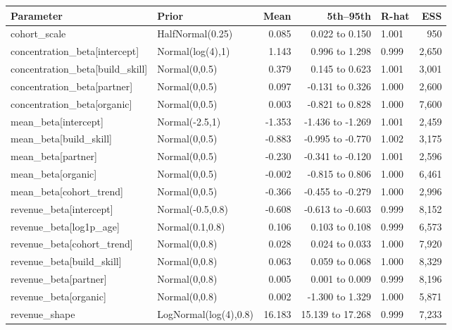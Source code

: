 \documentclass[10pt]{article}
\begin{document}
{\fontsize{7.8}{9.5}\selectfont \par\begin{tabularx}{\linewidth}{@{}p{.22\linewidth}p{.20\linewidth}rrYr@{}}\toprule
\textbf{Parameter} & \textbf{Prior} & \textbf{Mean} & \textbf{5th--95th} & \textbf{R-hat} & \textbf{ESS}\\\midrule
cohort\_scale & HalfNormal(0.25) & 0.085 & 0.022 to 0.150 & 1.001 & 950\\
concentration\_beta[intercept] & Normal(log(4),1) & 1.143 & 0.996 to 1.298 & 0.999 & 2,650\\
concentration\_beta[build\_skill] & Normal(0,0.5) & 0.379 & 0.145 to 0.623 & 1.001 & 3,001\\
concentration\_beta[partner] & Normal(0,0.5) & 0.097 & -0.131 to 0.326 & 1.000 & 2,600\\
concentration\_beta[organic] & Normal(0,0.5) & 0.003 & -0.821 to 0.828 & 1.000 & 7,600\\
mean\_beta[intercept] & Normal(-2.5,1) & -1.353 & -1.436 to -1.269 & 1.001 & 2,459\\
mean\_beta[build\_skill] & Normal(0,0.5) & -0.883 & -0.995 to -0.770 & 1.002 & 3,175\\
mean\_beta[partner] & Normal(0,0.5) & -0.230 & -0.341 to -0.120 & 1.001 & 2,596\\
mean\_beta[organic] & Normal(0,0.5) & -0.002 & -0.815 to 0.806 & 1.000 & 6,461\\
mean\_beta[cohort\_trend] & Normal(0,0.5) & -0.366 & -0.455 to -0.279 & 1.000 & 2,996\\
revenue\_beta[intercept] & Normal(-0.5,0.8) & -0.608 & -0.613 to -0.603 & 0.999 & 8,152\\
revenue\_beta[log1p\_age] & Normal(0.1,0.8) & 0.106 & 0.103 to 0.108 & 0.999 & 6,573\\
revenue\_beta[cohort\_trend] & Normal(0,0.8) & 0.028 & 0.024 to 0.033 & 1.000 & 7,920\\
revenue\_beta[build\_skill] & Normal(0,0.8) & 0.063 & 0.059 to 0.068 & 1.000 & 8,329\\
revenue\_beta[partner] & Normal(0,0.8) & 0.005 & 0.001 to 0.009 & 0.999 & 8,196\\
revenue\_beta[organic] & Normal(0,0.8) & 0.002 & -1.300 to 1.329 & 1.000 & 5,871\\
revenue\_shape & LogNormal(log(4),0.8) & 16.183 & 15.139 to 17.268 & 0.999 & 7,233\\
\bottomrule\end{tabularx}\par}
\end{document}
